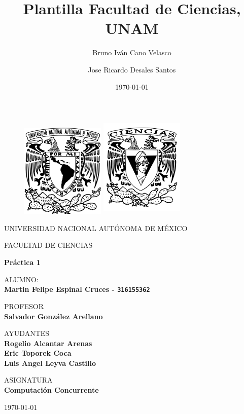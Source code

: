 \documentclass{article}
\title{Plantilla Facultad de Ciencias, UNAM}
\author{Bruno Iván Cano Velasco}
\author{Jose Ricardo Desales Santos}
\date{\today}
\begin{document}
\thispagestyle{empty}
	
	\begin{figure}[ht]
			\includegraphics[width=4cm]{assets/Logo_UNAM.png}
			\label{EscudoUNAM}
	   \endminipage
			\includegraphics[height = 4.9cm ,width=4cm]{assets/Logo_FC.png}
			\label{EscudoFC}
		\endminipage
	\end{figure}
	
	\begin{center}
	\vspace{0.8cm}
	\LARGE
	UNIVERSIDAD NACIONAL AUTÓNOMA DE MÉXICO 
	
	\vspace{0.7cm}
	\LARGE
	FACULTAD DE CIENCIAS
	
	\vspace{0.8 cm}	
	\Large
	\textbf{Práctica 1}

	\vspace{0.8 cm}
	\normalsize	
	ALUMNO: \\
	\vspace{.2cm}
	\large
	\textbf{Martin Felipe Espinal Cruces - \texttt{316155362}}
	
	\vspace{1 cm}
	\normalsize	
	PROFESOR \\
	\vspace{.2cm}
	\large
	\textbf{Salvador González Arellano}
	
	\vspace{1 cm}
	AYUDANTES \\
	\vspace{.2cm}
	\large
	\textbf{Rogelio Alcantar Arenas}\\
	\textbf{Eric Toporek Coca}\\
	\textbf{Luis Angel Leyva Castillo}
	\vspace{1.3cm}
	
	\normalsize	
	ASIGNATURA \\
	\vspace{.2cm}
	\large
	\textbf{Computación Concurrente}
	
	\vspace{1 cm}
	\today
	\end{center}
	
\end{document}
